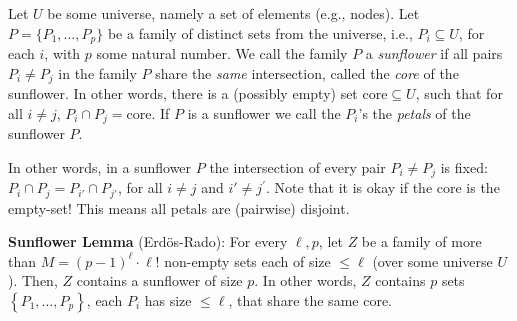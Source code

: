 
\begin{svgraybox}
\begin{definition}[Sunflower] Let $U$ be some universe, namely a set of elements (e.g., nodes). Let $P=\{P_1,\dots,P_p\}$ be a family of distinct sets from the universe, i.e., $P_i\subseteq U$, for each $i$, with $p$ some natural number. 
We call the family $P$ a \emph{sunflower} if  all pairs $P_i \neq P_j$ in the family $P$ share the \emph{same} intersection, called the \emph{core} of the sunflower.
In other words, there is a (possibly empty) set $\mathrm{core}\subseteq U$, such that for all $i\neq j$,  $ P_i\cap P_j = \mathrm{core}$.
If $P$ is a sunflower we call the $P_i$'s the \emph{petals} of the sunflower $P$.
\end{definition}
\end{svgraybox}
In other words, in a sunflower $P$ the intersection of every pair $P_i \neq P_j$ is fixed: $P_i \cap P_j=P_{i'} \cap P_{j'}$, for all $i \neq j $ and $ i' \neq j^{\prime}$.
Note that it is okay if the core is the empty-set! This means all petals are (pairwise) disjoint.


\begin{svgraybox}
\textbf{Sunflower Lemma} (Erd\"os-Rado): For every $\ell, p$, let $Z$ be a family of more than $M=(p-1)^\ell \cdot \ell!$ non-empty sets each of size $\leq \ell$ (over some universe $U$). Then, $Z$ contains a sunflower of size $p$. In other words, $Z$ contains $p$ sets $\left\{P_1, \ldots, P_p\right\}$, each $P_i$ has size $\leq \ell$, that share the same core. 
\end{svgraybox}



